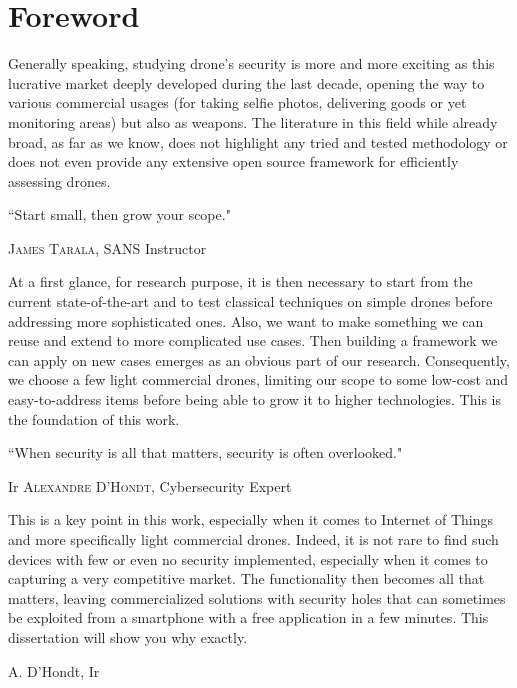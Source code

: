 \chapter*{Foreword}
\thispagestyle{empty}

\vspace{-2cm}
\vfill

\begin{center}
\begin{minipage}{15cm}
Generally speaking, studying drone's security is more and more exciting as this lucrative market deeply developed during the last decade, opening the way to various commercial usages (for taking selfie photos, delivering goods or yet monitoring areas) but also as weapons. The literature in this field while already broad, as far as we know, does not highlight any tried and tested methodology or does not even provide any extensive open source framework for efficiently assessing drones.

\vspace{-1.2cm}
\epigraph{``Start small, then grow your scope."}{\normalfont \textsc{James Tarala}, SANS Instructor}
\vspace{-1.2cm}

At a first glance, for research purpose, it is then necessary to start from the current state-of-the-art and to test classical techniques on simple drones before addressing more sophisticated ones. Also, we want to make something we can reuse and extend to more complicated use cases. Then building a framework we can apply on new cases emerges as an obvious part of our research. Consequently, we choose a few light commercial drones, limiting our scope to some low-cost and easy-to-address items before being able to grow it to higher technologies. This is the foundation of this work.

\epigraph{``When security is all that matters, security is often overlooked."}{Ir \textsc{Alexandre D'Hondt}, Cybersecurity Expert}
\vspace{-1.2cm}
This is a key point in this work, especially when it comes to Internet of Things and more specifically light commercial drones. Indeed, it is not rare to find such devices with few or even no security implemented, especially when it comes to capturing a very competitive market. The functionality then becomes all that matters, leaving commercialized solutions with security holes that can sometimes be exploited from a smartphone with a free application in a few minutes. This dissertation will show you why exactly.

\vspace{1cm}
\begin{flushright}
\begin{minipage}{4cm}
\raggedleft
A. D'Hondt, Ir
\end{minipage}
\end{flushright}

\end{minipage}
\end{center}

\vfill
